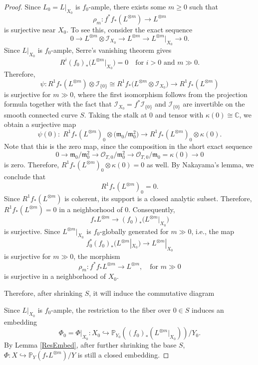 \documentclass[12pt]{amsart}
\numberwithin{equation}{section}
\theoremstyle{definition}
\theoremstyle{plain}
\newtheorem*{thm A*}{Theorem A}
\newtheorem*{thm B*}{Theorem B}
\newtheorem*{thm C*}{Theorem C}
\newtheorem*{thm D*}{Theorem D}
\theoremstyle{definition}
\renewcommand{\1}{\mathds{1}}
\renewcommand{\>}{\rightarrow}
\begin{document}
\begin{proof}
Since $L_0 = L|_{X_0}$ is $f_0$-ample,  there exists some $m\ge 0$ such that
$$\rho_m : f^* f_* (L^{\otimes m})\to L^{\otimes m}$$is surjective near $X_0$. To see this, consider the exact sequence 
\[
0 \to L^{\otimes m} \otimes \mathcal{I}_{X_0} \to L^{\otimes m} \to L^{\otimes m}|_{X_0} \to 0.
\]
Since $L|_{X_0}$ is $f_0$-ample, Serre’s vanishing theorem gives 
\[
R^i (f_0)_* \bigl(L^{\otimes m}|_{X_0}\bigr) = 0 \quad \text{for } i>0 \text{ and } m \gg 0.
\]
Therefore,
\[
\psi: R^1 f_* (L^{\otimes m}) \otimes \mathcal{I}_{\{0\}} 
\cong R^1 f_*\bigl(L^{\otimes m} \otimes \mathcal{I}_{X_0}\bigr) 
\longrightarrow R^1 f_* (L^{\otimes m})
\]
is surjective for $m \gg 0$, where the first isomorphism follows from the projection formula together with the fact that $\mathcal{I}_{X_0}=f^*\mathcal{I}_{\{0\}}$ and $\mathcal{I}_{\{0\}}$ are invertible on the smooth connected curve $S$. Taking the stalk at $0$ and tensor with $\kappa(0)\cong \mathbb{C}$, we obtain a surjective map
\[
\psi(0): \;  R^1 f_* (L^{\otimes m})_0 \otimes \bigl(\mathfrak{m}_0 / \mathfrak{m}_0^2\bigr)
\longrightarrow R^1 f_* (L^{\otimes m})_0 \otimes \kappa(0).
\]
Note that this is the zero map, since the composition in the short exact sequence 
\[
0\to \mathfrak{m}_{0} /\mathfrak{m}_{0}^2 \to \mathcal{O}_{T,0} /\mathfrak{m}_{0}^2 \to \mathcal{O}_{T,0} /\mathfrak{m}_{0} = \kappa (0) \to 0
\] 
is zero. Therefore, $R^1 f_* (L^{\otimes m})_0 \otimes \kappa(0) = 0$ as well. By Nakayama’s lemma, we conclude that 
\[
R^1 f_* (L^{\otimes m})_0 = 0.
\]
Since $R^1 f_* (L^{\otimes m})$ is coherent, its support is a closed analytic subset. Therefore, $R^1 f_* (L^{\otimes m}) = 0$ in a neighborhood of $0$. Consequently,
\[
f_* L^{\otimes m} \longrightarrow (f_0)_* \bigl(L^{\otimes m}|_{X_0}\bigr)
\]
is surjective. Since $L^{\otimes m}|_{X_0}$ is $f_0$-globally generated for $m\gg 0$, i.e., the map
\[
f_0^* (f_0)_* (L^{\otimes m} |_{X_0} ) \to L^{\otimes m}|_{X_0}
\]
is surjective for $m\gg 0$, the morphism
\[
\rho_m: f^* f_* L^{\otimes m} \longrightarrow L^{\otimes m}, \quad \text{for } m\gg 0
\]
is surjective in a neighborhood of $X_0$.


Therefore, after shrinking $S$, it will induce the commutative diagram  
\begin{center}
\end{center}
Since $L|_{X_0}$ is $f_0$-ample, the restriction to the fiber over $0 \in S$ induces an embedding
$$\Phi_0 = \Phi|_{X_0}: X_0 \hookrightarrow \mathbb{P}_{Y_0}((f_0)_* (L^{\otimes m}|_{X_0}))/Y_0.$$
By Lemma \ref{ResEmbed}, after further shrinking the base $S$, $\Phi:X \hookrightarrow \mathbb{P}_{Y}(f_* L^{\otimes m})/Y$ is still a closed embedding.


\end{proof}
\end{document}

